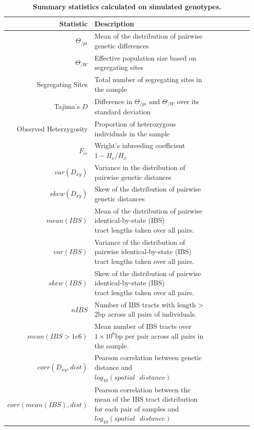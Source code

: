 \documentclass[11pt,twoside,lineno]{preprint}
\begin{document}
\begin{table}
\label{table:sumstats}
\small
\centering
\caption{\bf Summary statistics calculated on simulated genotypes.}
\begin{tabular}{rllrrrrr}
  \hline
Statistic & Description \\ 
  \hline
$\Theta_{/pi}$ & Mean of the distribution of pairwise genetic differences \\
$\Theta_{/W}$ & Effective population size based on segregating sites \\
Segregating Sites & Total number of segregating sites in the sample \\
Tajima's $D$ & Difference in $\Theta_{/pi}$ and $\Theta_{/W}$ over its standard deviation\\
Observed Heterzygosity & Proportion of heterozygous individuals in the sample \\
$F_{is}$ & Wright's inbreeding coefficient $1-H_{e}/H_{o}$ \\
$var(D_{xy})$ & Variance in the distribution of pairwise genetic distances \\
$skew(D_{xy})$ & Skew of the distribution of pairwise genetic distances \\
$mean(IBS)$ & \makecell[l]{Mean of the distribution of pairwise identical-by-state (IBS) \\tract lengths taken over all pairs.} \\
$var(IBS)$ & \makecell[l]{Variance of the distribution of pairwise identical-by-state (IBS) \\tract lengths taken over all pairs.} \\
$skew(IBS)$ & \makecell[l]{Skew of the distribution of pairwise identical-by-state (IBS) \\tract lengths taken over all pairs.} \\
$nIBS$ & Number of IBS tracts with length > 2bp across all pairs of individuals. \\
$mean(IBS>1e6)$ & \makecell[l]{Mean number of IBS tracts over $1\times10^6$bp per pair \\across all pairs in the sample.} \\ 
$corr(D_{xy},dist)$ & Pearson correlation between genetic distance and $log_{10}(spatial\text{ }distance)$ \\
$corr(mean(IBS),dist)$ & \makecell[l]{Pearson correlation between the mean of the IBS tract distribution \\for each pair of samples and $log_{10}(spatial\text{ }distance)$} \\

\end{tabular}
\end{table}
\end{document}
